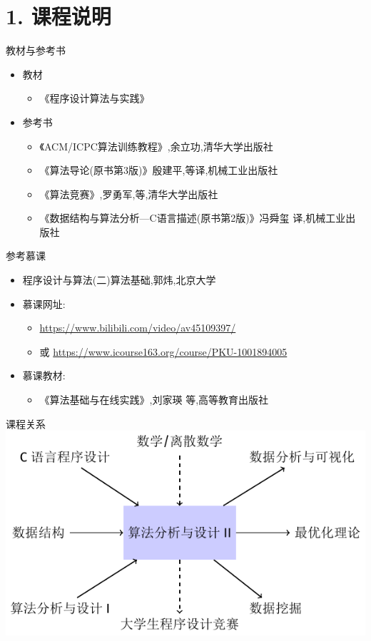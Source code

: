


\frame{\titlepage}
\section{1. 课程说明}
\begin{frame}{教材与参考书}
    \begin{itemize}
        \item 教材
        \begin{itemize}
            \item《程序设计算法与实践》
        \end{itemize}
        \vfill
        \item 参考书
        \begin{itemize}
            \item 《ACM/ICPC算法训练教程》,余立功,清华大学出版社
            \item 《算法导论(原书第3版)》殷建平,等译,机械工业出版社
            \item 《算法竞赛》,罗勇军,等,清华大学出版社
            \item 《数据结构与算法分析—C语言描述(原书第2版)》冯舜玺 译,机械工业出版社
        \end{itemize}
    \end{itemize}
\end{frame}
\begin{frame}{参考慕课}
    \begin{itemize}
        \item 程序设计与算法(二)算法基础,郭炜,北京大学
        \vfill
        \item 慕课网址:
        \begin{itemize}
            \item \url{https://www.bilibili.com/video/av45109397/}
            \item 或 \url{https://www.icourse163.org/course/PKU-1001894005}
        \end{itemize}
        \vfill
        \item 慕课教材:
        \begin{itemize}
            \item 《算法基础与在线实践》,刘家瑛 等,高等教育出版社
        \end{itemize}
    \end{itemize}
\end{frame}
\begin{frame}{课程关系}
    \includegraphics[center]{fig/1-1.pdf}
\end{frame}
